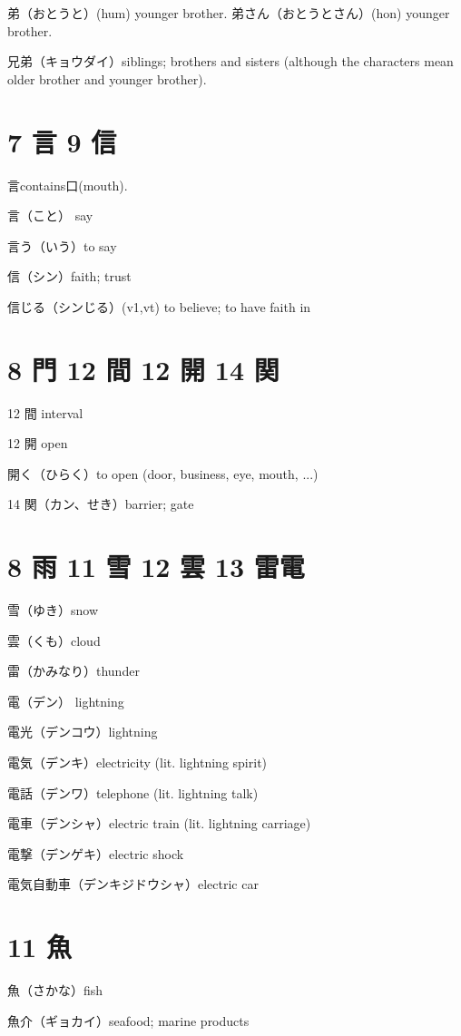 弟（おとうと）(hum) younger brother.
弟さん（おとうとさん）(hon) younger brother.

兄弟（キョウダイ）siblings;
brothers and sisters
(although the characters mean older brother and younger brother).

\section{7 言 9 信}

言contains口(mouth).

言（こと） say

言う（いう）to say

信（シン）faith; trust

信じる（シンじる）(v1,vt) to believe; to have faith in

\section{8 門 12 間 12 開 14 関}

12 間 interval

12 開 open

開く（ひらく）to open (door, business, eye, mouth, ...)

14 関（カン、せき）barrier; gate

\section{8 雨 11 雪 12 雲 13 雷電}

雪（ゆき）snow

雲（くも）cloud

雷（かみなり）thunder

電（デン） lightning

電光（デンコウ）lightning

電気（デンキ）electricity (lit. lightning spirit)

電話（デンワ）telephone (lit. lightning talk)

電車（デンシャ）electric train (lit. lightning carriage)

電撃（デンゲキ）electric shock

電気自動車（デンキジドウシャ）electric car

\section{11 魚}

魚（さかな）fish

魚介（ギョカイ）seafood; marine products

